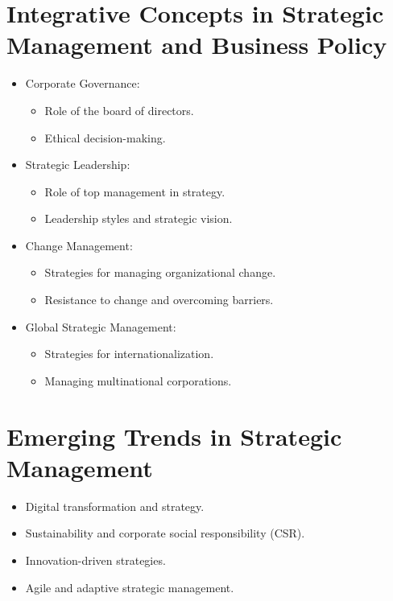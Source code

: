 \section{Integrative Concepts in Strategic Management and Business Policy}
\begin{itemize}
    \item Corporate Governance:
    \begin{itemize}
        \item Role of the board of directors.
        \item Ethical decision-making.
    \end{itemize}
    \item Strategic Leadership:
    \begin{itemize}
        \item Role of top management in strategy.
        \item Leadership styles and strategic vision.
    \end{itemize}
    \item Change Management:
    \begin{itemize}
        \item Strategies for managing organizational change.
        \item Resistance to change and overcoming barriers.
    \end{itemize}
    \item Global Strategic Management:
    \begin{itemize}
        \item Strategies for internationalization.
        \item Managing multinational corporations.
    \end{itemize}
\end{itemize}

\section{Emerging Trends in Strategic Management}
\begin{itemize}
    \item Digital transformation and strategy.
    \item Sustainability and corporate social responsibility (CSR).
    \item Innovation-driven strategies.
    \item Agile and adaptive strategic management.
\end{itemize}
